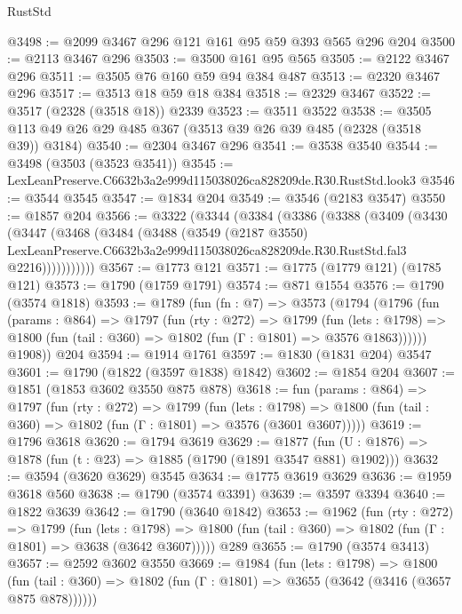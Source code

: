 \begin{lexlean}{RustStd}
\begin{coremodule}
@3498 := @2099 @3467 @296 @121 @161 @95 @59 @393 @565 @296 @204
@3500 := @2113 @3467 @296
@3503 := @3500 @161 @95 @565
@3505 := @2122 @3467 @296
@3511 := @3505 @76 @160 @59 @94 @384 @487
@3513 := @2320 @3467 @296
@3517 := @3513 @18 @59 @18 @384
@3518 := @2329 @3467
@3522 := @3517 (@2328 (@3518 @18)) @2339
@3523 := @3511 @3522
@3538 := @3505 @113 @49 @26 @29 @485 @367 (@3513 @39 @26 @39 @485 (@2328 (@3518 @39)) @3184)
@3540 := @2304 @3467 @296
@3541 := @3538 @3540
@3544 := @3498 (@3503 (@3523 @3541))
@3545 := LexLeanPreserve.C6632b3a2e999d115038026ca828209de.R30.RustStd.look3
@3546 := @3544 @3545
@3547 := @1834 @204
@3549 := @3546 (@2183 @3547)
@3550 := @1857 @204
@3566 := @3322
    (@3344
      (@3384
        (@3386
          (@3388
            (@3409
              (@3430
                (@3447
                  (@3468
                    (@3484
                      (@3488
                        (@3549
                          (@2187 @3550)
                          LexLeanPreserve.C6632b3a2e999d115038026ca828209de.R30.RustStd.fal3
                          @2216)))))))))))
@3567 := @1773 @121
@3571 := @1775 (@1779 @121) (@1785 @121)
@3573 := @1790 (@1759 @1791)
@3574 := @871 @1554
@3576 := @1790 (@3574 @1818)
@3593 := @1789
    (fun (fn : @7) =>
    @3573
      (@1794
        (@1796
          (fun (params : @864) =>
          @1797
            (fun (rty : @272) =>
            @1799
              (fun (lets : @1798) =>
              @1800 (fun (tail : @360) => @1802 (fun (Γ : @1801) => @3576 @1863))))))
        @1908))
    @204
@3594 := @1914 @1761
@3597 := @1830 (@1831 @204) @3547
@3601 := @1790 (@1822 (@3597 @1838) @1842)
@3602 := @1854 @204
@3607 := @1851 (@1853 @3602 @3550 @875 @878)
@3618 := fun (params : @864) =>
  @1797
    (fun (rty : @272) =>
    @1799
      (fun (lets : @1798) =>
      @1800 (fun (tail : @360) => @1802 (fun (Γ : @1801) => @3576 (@3601 @3607)))))
@3619 := @1796 @3618
@3620 := @1794 @3619
@3629 := @1877 (fun (U : @1876) => @1878 (fun (t : @23) => @1885 (@1790 (@1891 @3547 @881) @1902)))
@3632 := @3594 (@3620 @3629) @3545
@3634 := @1775 @3619 @3629
@3636 := @1959 @3618 @560
@3638 := @1790 (@3574 @3391)
@3639 := @3597 @3394
@3640 := @1822 @3639
@3642 := @1790 (@3640 @1842)
@3653 := @1962
    (fun (rty : @272) =>
    @1799
      (fun (lets : @1798) =>
      @1800 (fun (tail : @360) => @1802 (fun (Γ : @1801) => @3638 (@3642 @3607)))))
    @289
@3655 := @1790 (@3574 @3413)
@3657 := @2592 @3602 @3550
@3669 := @1984
    (fun (lets : @1798) =>
    @1800 (fun (tail : @360) => @1802 (fun (Γ : @1801) => @3655 (@3642 (@3416 (@3657 @875 @878))))))

\end{coremodule}
\end{lexlean}
